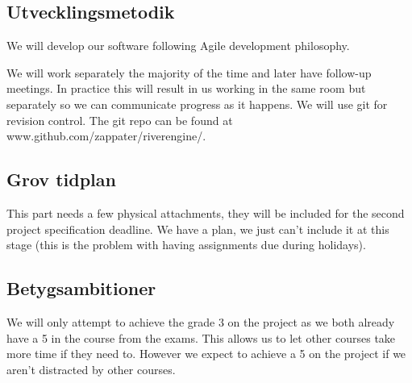 \documentclass[12pt,a4paper]{article}
\begin{document}
\subsection{Utvecklingsmetodik}

We will develop our software following Agile development philosophy.

We will work separately the majority of the time and later have follow-up meetings. In practice this will result in us working in the same room but separately so we can communicate progress as it happens.
We will use git for revision control. The git repo can be found at www.github.com/zappater/riverengine/.


\subsection{Grov tidplan}

This part needs a few physical attachments, they will be included for the second project specification deadline.
We have a plan, we just can't include it at this stage (this is the problem with having assignments due during holidays).


\subsection{Betygsambitioner}

We will only attempt to achieve the grade 3 on the project as we both already have a 5 in the course from the exams. This allows us to let other courses take more time if they need to.
However we expect to achieve a 5 on the project if we aren't distracted by other courses.
\end{document}
